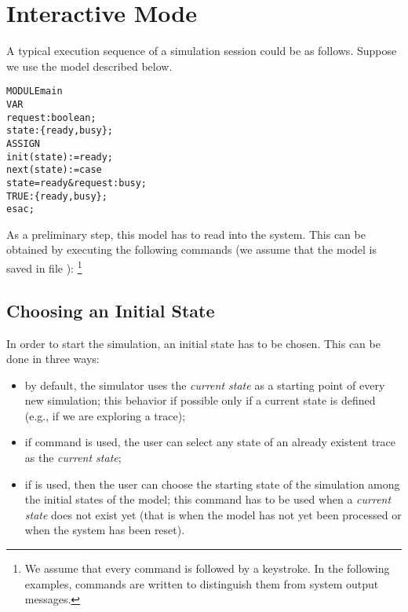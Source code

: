 \section{Interactive Mode}
\label{Interactive Mode}

A typical execution sequence of a simulation session could be as follows. Suppose
we use the model described below.\\
\begin{alltt}
MODULE main
VAR
  request : boolean;
  state : \{ready,busy\};
ASSIGN
  init(state) := ready;
  next(state) := case
                   state = ready & request : busy;
                   TRUE                    : \{ready,busy\};
                 esac;
\end{alltt}

As a preliminary step, this model has to read into the \nusmv system.
This can be obtained by executing the following commands (we assume that the model is
saved in file ):
\footnote{We assume that every \nusmv command is followed by a
\ret keystroke. In the following examples,
\nusmv commands are written {} to
distinguish them from system output messages.}
\begin{alltt}
\shellprompt {}
\nusmvprompt {}
\nusmvprompt
\end{alltt}

\subsection{Choosing an Initial State}
\label{Choosing an Initial State}
In order to start the simulation, an initial state has to be
chosen. This can be done in three ways:
\begin{itemize}
\item by default, the simulator uses the \emph{current state} as a 
starting point of every new simulation; this behavior if possible only
if a current state is defined (e.g., if we are exploring a trace);
\item if command  is used,
the user can select any state of an already existent
trace as the \emph{current state};
\item if  is used, then 
the user can choose the starting state of the simulation among the
initial states of the model; this command has to be used when a
\emph{current state} does not exist yet (that is when the model has
not yet been processed or when the system has been reset).
\end{itemize}

